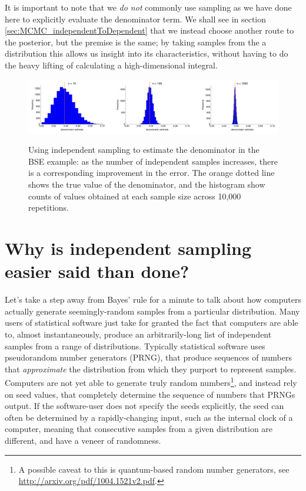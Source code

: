 \documentclass[11pt,fullpage]{book}
\begin{document}
It is important to note that we \textit{do not} commonly use sampling as we have done here to explicitly evaluate the denominator term. We shall see in section \ref{sec:MCMC_independentToDependent} that we instead choose another route to the posterior, but the premise is the same; by taking samples from the a distribution this allows us insight into its characteristics, without having to do the heavy lifting of calculating a high-dimensional integral.

\begin{figure}
\centering
\scalebox{0.25} 
{\includegraphics{MCMC_BSEindependentSampling.pdf}}
\caption{Using independent sampling to estimate the denominator in the BSE example: as the number of independent samples increases, there is a corresponding improvement in the error. The orange dotted line shows the true value of the denominator, and the histogram show counts of values obtained at each sample size across 10,000 repetitions.}\label{fig:MCMC_BSEindependentSampling}
\end{figure}



\section{Why is independent sampling easier said than done?}\label{sec:MCMC_independentSamplingDifficult}
Let's take a step away from Bayes' rule for a minute to talk about how computers actually generate seemingly-random samples from a particular distribution. Many users of statistical software just take for granted the fact that computers are able to, almost instantaneously, produce an arbitrarily-long list of independent samples from a range of distributions. Typically statistical software uses pseudorandom number generators (PRNG), that produce sequences of numbers that \textit{approximate} the distribution from which they purport to represent samples. Computers are not yet able to generate truly random numbers\footnote{A possible caveat to this is quantum-based random number generators, see \url{http://arxiv.org/pdf/1004.1521v2.pdf}.}, and instead rely on seed values, that completely determine the sequence of numbers that PRNGs output. If the software-user does not specify the seeds explicitly, the seed can often be determined by a rapidly-changing input, such as the internal clock of a computer, meaning that consecutive samples from a given distribution are different, and have a veneer of randomness. 
\end{document}
